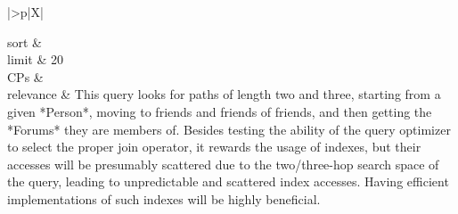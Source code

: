 \begin{tabularx}{\queryCardWidth}{|>{\queryPropertyCell}p{\queryPropertyCellWidth}|X|}
%
	
		sort		&
		\innerCardVSpace \\ \hline
	limit & 20 \\ \hline
	CPs &
	 \\ \hline
	relevance &
		\footnotesize This query looks for paths of length two and three, starting from a given *Person*, moving to friends and friends of friends, and then getting the *Forums* they are members of. Besides testing the ability of the query optimizer to select the proper join operator, it rewards the usage of indexes, but their accesses will be presumably scattered due to the two/three-hop search space of the query, leading to unpredictable and scattered index accesses. Having efficient implementations of such indexes will be highly beneficial.
 \\ \hline%
\end{tabularx}
\queryCardVSpace

\let\emph\oldemph